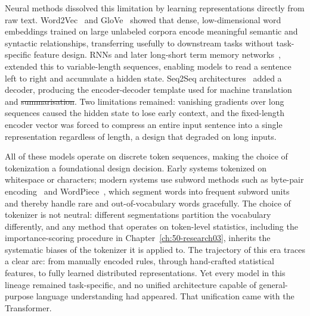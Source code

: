 \documentclass[12pt, a4paper, twoside]{book}
\makeatletter
\numberwithin{equation}{chapter}
\theoremstyle{plain}
\theoremstyle{definition}
\theoremstyle{remark}
\newenvironment{foldable}{}{}
\providecommand{\DIFaddtex}[1]{{\protect\color{blue}\uwave{#1}}} %
\providecommand{\DIFdeltex}[1]{{\protect\color{red}\sout{#1}}} %
\providecommand{\DIFaddbegin}{} %
\providecommand{\DIFaddend}{} %
\providecommand{\DIFdelbegin}{} %
\providecommand{\DIFdelend}{} %
\providecommand{\DIFadd}[1]{\texorpdfstring{\DIFaddtex{#1}}{#1}} %
\providecommand{\DIFdel}[1]{\texorpdfstring{\DIFdeltex{#1}}{}} %
\newcommand{\DIFscaledelfig}{0.5}
\newlength{\DIFdelgraphicswidth} %
\newlength{\DIFdelgraphicsheight} %
\newcommand{\DIFaddincludegraphics}[2][]{{\color{blue}\fbox{\DIFOincludegraphics[#1]{#2}}}} %
\newcommand{\DIFdelincludegraphics}[2][]{%
\sbox{\DIFdelgraphicsbox}{\DIFOincludegraphics[#1]{#2}}%
\settoboxwidth{\DIFdelgraphicswidth}{\DIFdelgraphicsbox} %
\settoboxtotalheight{\DIFdelgraphicsheight}{\DIFdelgraphicsbox} %
\scalebox{\DIFscaledelfig}{%
\parbox[b]{\DIFdelgraphicswidth}{\usebox{\DIFdelgraphicsbox}\\[-\baselineskip] \rule{\DIFdelgraphicswidth}{0em}}\llap{\resizebox{\DIFdelgraphicswidth}{\DIFdelgraphicsheight}{%
\setlength{\unitlength}{\DIFdelgraphicswidth}%
\begin{picture}(1,1)%
\thicklines\linethickness{2pt} %
{\color[rgb]{1,0,0}\put(0,0){\framebox(1,1){}}}%
{\color[rgb]{1,0,0}\put(0,0){\line( 1,1){1}}}%
{\color[rgb]{1,0,0}\put(0,1){\line(1,-1){1}}}%
\end{picture}%
}\hspace*{3pt}}} %
} %
\DeclareRobustCommand{\DIFaddbegin}{\DIFOaddbegin \let\includegraphics\DIFaddincludegraphics} %
\DeclareRobustCommand{\DIFaddend}{\DIFOaddend \let\includegraphics\DIFOincludegraphics} %
\DeclareRobustCommand{\DIFdelbegin}{\DIFOdelbegin \let\includegraphics\DIFdelincludegraphics} %
\DeclareRobustCommand{\DIFdelend}{\DIFOaddend \let\includegraphics\DIFOincludegraphics} %
\let\sout@orig\sout %
\renewcommand{\sout}[1]{\ifmmode\text{\sout@orig{\ensuremath{#1}}}\else\sout@orig{#1}\fi} %
\makeatother
\begin{document}
\begin{foldable}
  Neural methods dissolved this limitation by learning representations directly from raw text.
  Word2Vec~\cite{mikolov2013distributed} and GloVe~\cite{pennington2014glove} showed that dense, low-dimensional word embeddings trained on large unlabeled corpora encode meaningful semantic and syntactic relationships, transferring usefully to downstream tasks without task-specific feature design.
  \Acp{RNN} and later long-short term memory networks~\cite{hochreiter1997long}, extended this to variable-length sequences, enabling models to read a sentence left to right and accumulate a hidden state.
  Seq2Seq architectures~\cite{sutskever2014sequence} added a decoder, producing the encoder-decoder template used for machine translation and \DIFdelbegin \DIFdel{summarisation}\DIFdelend \DIFaddbegin \DIFadd{summarization}\DIFaddend .
  Two limitations remained: vanishing gradients over long sequences caused the hidden state to lose early context, and the fixed-length encoder vector was forced to compress an entire input sentence into a single representation regardless of length, a design that degraded on long inputs.
\end{foldable}

\begin{foldable}
  All of these models operate on discrete token sequences, making the choice of tokenization a foundational design decision.
  Early systems tokenized on whitespace or characters; modern systems use subword methods such as byte-pair encoding~\cite{sennrich2016neural} and WordPiece~\cite{wu2016google}, which segment words into frequent subword units and thereby handle rare and out-of-vocabulary words gracefully.
  The choice of tokenizer is not neutral: different segmentations partition the vocabulary differently, and any method that operates on token-level statistics, including the importance-scoring procedure in Chapter~\ref{ch:50-research03}, inherits the systematic biases of the tokenizer it is applied to.
  The trajectory of this era traces a clear arc: from manually encoded rules, through hand-crafted statistical features, to fully learned distributed representations. Yet every model in this lineage remained task-specific, and no unified architecture capable of general-purpose language understanding had appeared.
  That unification came with the Transformer.
\end{foldable}
\end{document}

